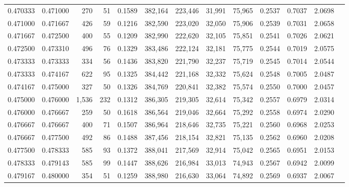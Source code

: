 \begin{tabular}{rrrrrrrrrrrrr}
0.470333 & 0.471000 &   270 &  51 &                                     0.1589 & 382,164 & 223,446 &  31,991 &  75,965 & 0.2537 & 0.7037 & 2.0698 \\
0.471000 & 0.471667 &   426 &  59 &                                     0.1216 & 382,590 & 223,020 &  32,050 &  75,906 & 0.2539 & 0.7031 & 2.0658 \\
0.471667 & 0.472500 &   400 &  55 &                                     0.1209 & 382,990 & 222,620 &  32,105 &  75,851 & 0.2541 & 0.7026 & 2.0621 \\
0.472500 & 0.473310 &   496 &  76 &                                     0.1329 & 383,486 & 222,124 &  32,181 &  75,775 & 0.2544 & 0.7019 & 2.0575 \\
0.473333 & 0.473333 &   334 &  56 &                                     0.1436 & 383,820 & 221,790 &  32,237 &  75,719 & 0.2545 & 0.7014 & 2.0544 \\
0.473333 & 0.474167 &   622 &  95 &                                     0.1325 & 384,442 & 221,168 &  32,332 &  75,624 & 0.2548 & 0.7005 & 2.0487 \\
0.474167 & 0.475000 &   327 &  50 &                                     0.1326 & 384,769 & 220,841 &  32,382 &  75,574 & 0.2550 & 0.7000 & 2.0457 \\
0.475000 & 0.476000 & 1,536 & 232 &                                     0.1312 & 386,305 & 219,305 &  32,614 &  75,342 & 0.2557 & 0.6979 & 2.0314 \\
0.476000 & 0.476667 &   259 &  50 &                                     0.1618 & 386,564 & 219,046 &  32,664 &  75,292 & 0.2558 & 0.6974 & 2.0290 \\
0.476667 & 0.476667 &   400 &  71 &                                     0.1507 & 386,964 & 218,646 &  32,735 &  75,221 & 0.2560 & 0.6968 & 2.0253 \\
0.476667 & 0.477500 &   492 &  86 &                                     0.1488 & 387,456 & 218,154 &  32,821 &  75,135 & 0.2562 & 0.6960 & 2.0208 \\
0.477500 & 0.478333 &   585 &  93 &                                     0.1372 & 388,041 & 217,569 &  32,914 &  75,042 & 0.2565 & 0.6951 & 2.0153 \\
0.478333 & 0.479143 &   585 &  99 &                                     0.1447 & 388,626 & 216,984 &  33,013 &  74,943 & 0.2567 & 0.6942 & 2.0099 \\
0.479167 & 0.480000 &   354 &  51 &                                     0.1259 & 388,980 & 216,630 &  33,064 &  74,892 & 0.2569 & 0.6937 & 2.0067 \\

\end{tabular}
